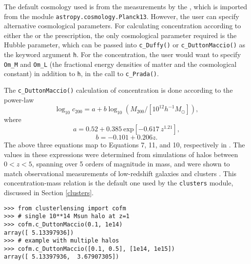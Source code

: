 \documentclass[twocolumn]{aastex6}
\newcommand{\code}{\lstinline[style=codeintext]}
\begin{document}
The default cosmology used is from the measurements by the \citet{PlanckXVI}, which is imported from the module \code{astropy.cosmology.Planck13}. However, the user can specify alternative cosmological parameters. For calculating concentration according to either the \citet{Duffy08} or the \citet{Dutton14} prescription, the only cosmological parameter required is the Hubble parameter, which can be passed into \code{c_Duffy()} or \code{c_DuttonMaccio()} as the keyword argument \code{h}. For the \citet{Prada12} concentration, the user would want to specify \code{Om_M} and \code{Om_L} (the fractional energy densities of matter and the cosmological constant) in addition to \code{h}, in the call to \code{c_Prada()}.

The \code{c_DuttonMaccio()} calculation of concentration is done according to the power-law
\begin{equation}
\log_{10} c_{200} = a + b \log_{10}(M_{200} / [10^{12} h^{-1} M_{\odot}]),
\end{equation}
where
\begin{equation}
a = 0.52 + 0.385\ \mathrm{exp}[-0.617\ z^{1.21}],
\end{equation}
\begin{equation}
b = -0.101 + 0.206 z.
\end{equation}
The above three equations map to Equations 7, 11, and 10, respectively in \citet{Dutton14}. The values in these expressions were determined from simulations of halos between $0 < z < 5$, spanning over 5 orders of magnitude in mass, and were shown to match observational measurements of low-redshift galaxies and clusters \citep{Dutton14}. This concentration-mass relation is the default one used by the \code{clusters} module, discussed in Section \ref{clusters}.

\begin{verbatim}
>>> from clusterlensing import cofm
>>> # single 10**14 Msun halo at z=1
>>> cofm.c_DuttonMaccio(0.1, 1e14)
array([ 5.13397936])
>>> # example with multiple halos
>>> cofm.c_DuttonMaccio([0.1, 0.5], [1e14, 1e15])
array([ 5.13397936,  3.67907305])
\end{verbatim}
\end{document}
